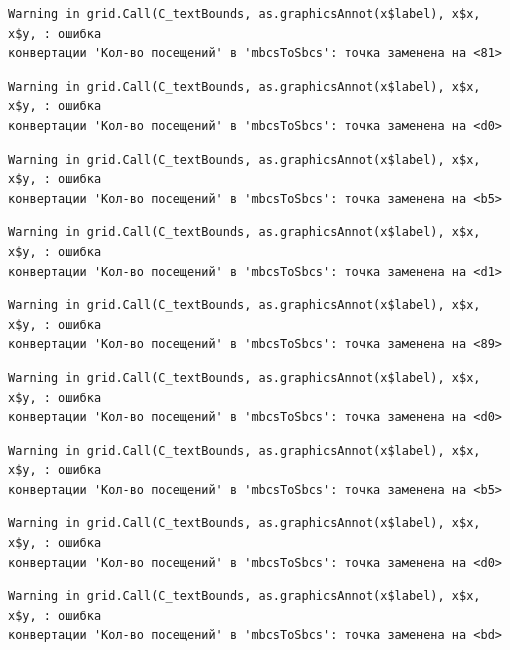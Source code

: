 \documentclass[
  letterpaper,
  DIV=11,
  numbers=noendperiod]{scrreprt}
\begin{document}
\begin{verbatim}
Warning in grid.Call(C_textBounds, as.graphicsAnnot(x$label), x$x, x$y, : ошибка
конвертации 'Кол-во посещений' в 'mbcsToSbcs': точка заменена на <81>
\end{verbatim}

\begin{verbatim}
Warning in grid.Call(C_textBounds, as.graphicsAnnot(x$label), x$x, x$y, : ошибка
конвертации 'Кол-во посещений' в 'mbcsToSbcs': точка заменена на <d0>
\end{verbatim}

\begin{verbatim}
Warning in grid.Call(C_textBounds, as.graphicsAnnot(x$label), x$x, x$y, : ошибка
конвертации 'Кол-во посещений' в 'mbcsToSbcs': точка заменена на <b5>
\end{verbatim}

\begin{verbatim}
Warning in grid.Call(C_textBounds, as.graphicsAnnot(x$label), x$x, x$y, : ошибка
конвертации 'Кол-во посещений' в 'mbcsToSbcs': точка заменена на <d1>
\end{verbatim}

\begin{verbatim}
Warning in grid.Call(C_textBounds, as.graphicsAnnot(x$label), x$x, x$y, : ошибка
конвертации 'Кол-во посещений' в 'mbcsToSbcs': точка заменена на <89>
\end{verbatim}

\begin{verbatim}
Warning in grid.Call(C_textBounds, as.graphicsAnnot(x$label), x$x, x$y, : ошибка
конвертации 'Кол-во посещений' в 'mbcsToSbcs': точка заменена на <d0>
\end{verbatim}

\begin{verbatim}
Warning in grid.Call(C_textBounds, as.graphicsAnnot(x$label), x$x, x$y, : ошибка
конвертации 'Кол-во посещений' в 'mbcsToSbcs': точка заменена на <b5>
\end{verbatim}

\begin{verbatim}
Warning in grid.Call(C_textBounds, as.graphicsAnnot(x$label), x$x, x$y, : ошибка
конвертации 'Кол-во посещений' в 'mbcsToSbcs': точка заменена на <d0>
\end{verbatim}

\begin{verbatim}
Warning in grid.Call(C_textBounds, as.graphicsAnnot(x$label), x$x, x$y, : ошибка
конвертации 'Кол-во посещений' в 'mbcsToSbcs': точка заменена на <bd>
\end{verbatim}
\end{document}
